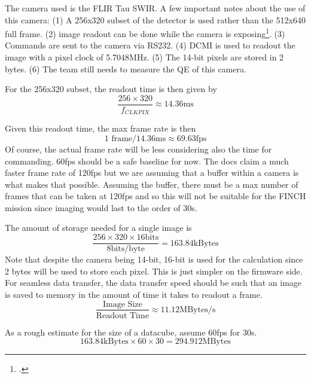\documentclass[12pt,a4paper]{article}
\begin{document}
    The camera used is the FLIR Tau SWIR. A few important notes about the use of 
    this camera: (1) A 256x320 subset of the detector is used rather than
    the 512x640 full frame. (2) image readout can be done while the camera is exposing\footcite{TAU_ProdSpec}. 
    (3) Commands are sent to the camera via RS232. (4) DCMI is used to readout 
    the image with a pixel clock of 5.7048MHz. (5) The 14-bit pixels are 
    stored in 2 bytes. (6) The team still needs to measure the QE of this camera. 

    For the 256x320 subset, the readout time is then given by 
    \begin{equation}
        \frac{256 \times 320}{f_{CLKPIX}} \approx 14.36\text{ms}
    \end{equation}

    Given this readout time, the max frame rate is then 
    \begin{equation}
        1 \text{ frame} / 14.36\text{ms} \approx 69.63 \text{fps}
    \end{equation}
    Of course, the actual frame rate will be less considering also the 
    time for commanding. 60fps should be a safe baseline for now. The docs claim a much faster frame rate of 120fps but we are assuming that 
    a buffer within a camera is what makes that possible. Assuming the buffer, 
    there must be a max number of frames that can be taken at 120fps and so this 
    will not be suitable for the FINCH mission since imaging would last to the 
    order of 30s. 

    The amount of storage needed for a single image is 
    \begin{equation}\label{eqn:image_size}
        \frac{256\times320\times16 \text{bits}}{8 \text{bits/byte}} = 163.84\text{kBytes}
    \end{equation}
    Note that despite the camera being 14-bit, 16-bit is used for the calculation 
    since 2 bytes will be used to store each pixel. This is just simpler on the firmware side. 
    For seamless data transfer, the data transfer speed should be such that an image 
    is saved to memory in the amount of time it takes to readout a frame. 
    \begin{equation}\label{eqn:trans_time}
        \frac{\text{Image Size}}{\text{Readout Time}} \approx 11.12 \text{MBytes/s}
    \end{equation}

    As a rough estimate for the size of a datacube, assume 60fps for 30s. 
    \begin{equation}
        163.84\text{kBytes} \times 60 \times 30 = 294.912 \text{MBytes}
    \end{equation}
\end{document}
